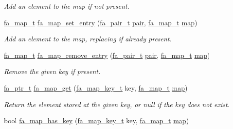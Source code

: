 \begin{DoxyCompactItemize}
\begin{DoxyCompactList}\small\item\em Add an element to the map if not present. \end{DoxyCompactList}\item 
\hyperlink{group___fa_map_gadcbb0c425af31be6aeb265159b2a7db0}{fa\-\_\-map\-\_\-t} \hyperlink{group___fa_map_ga2f7b35137e12c3f63bf6c8492e438937}{fa\-\_\-map\-\_\-set\-\_\-entry} (\hyperlink{group___fa_pair_gac2b2e58c230bac4f8a63ef6c05072680}{fa\-\_\-pair\-\_\-t} \hyperlink{util_8h_a40ed40659d2ed7f8712b0fe6ba6edebe}{pair}, \hyperlink{group___fa_map_gadcbb0c425af31be6aeb265159b2a7db0}{fa\-\_\-map\-\_\-t} \hyperlink{literals_8h_a44305f0bc81207be0dcc90650733e331}{map})
\begin{DoxyCompactList}\small\item\em Add an element to the map, replacing if already present. \end{DoxyCompactList}\item 
\hyperlink{group___fa_map_gadcbb0c425af31be6aeb265159b2a7db0}{fa\-\_\-map\-\_\-t} \hyperlink{group___fa_map_ga3b4cb5d328675f599cbbf533cdec3860}{fa\-\_\-map\-\_\-remove\-\_\-entry} (\hyperlink{group___fa_pair_gac2b2e58c230bac4f8a63ef6c05072680}{fa\-\_\-pair\-\_\-t} \hyperlink{util_8h_a40ed40659d2ed7f8712b0fe6ba6edebe}{pair}, \hyperlink{group___fa_map_gadcbb0c425af31be6aeb265159b2a7db0}{fa\-\_\-map\-\_\-t} \hyperlink{literals_8h_a44305f0bc81207be0dcc90650733e331}{map})
\begin{DoxyCompactList}\small\item\em Remove the given key if present. \end{DoxyCompactList}\item 
\hyperlink{group___fa_ga915ddeae99ad7568b273d2b876425197}{fa\-\_\-ptr\-\_\-t} \hyperlink{group___fa_map_ga23e3bce2dfad5f3c7c2ef518dfe3ca70}{fa\-\_\-map\-\_\-get} (\hyperlink{group___fa_map_ga01c714699c14e805664c65b6a0ea974d}{fa\-\_\-map\-\_\-key\-\_\-t} key, \hyperlink{group___fa_map_gadcbb0c425af31be6aeb265159b2a7db0}{fa\-\_\-map\-\_\-t} \hyperlink{literals_8h_a44305f0bc81207be0dcc90650733e331}{map})
\begin{DoxyCompactList}\small\item\em Return the element stored at the given key, or {\ttfamily null} if the key does not exist. \end{DoxyCompactList}\item 
bool \hyperlink{group___fa_map_ga3bfe761e64c42dd57f7598a149b91808}{fa\-\_\-map\-\_\-has\-\_\-key} (\hyperlink{group___fa_map_ga01c714699c14e805664c65b6a0ea974d}{fa\-\_\-map\-\_\-key\-\_\-t} key, \hyperlink{group___fa_map_gadcbb0c425af31be6aeb265159b2a7db0}{fa\-\_\-map\-\_\-t} \hyperlink{literals_8h_a44305f0bc81207be0dcc90650733e331}{map})

\end{DoxyCompactItemize}
